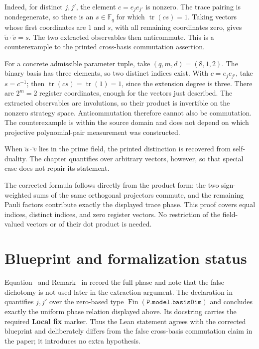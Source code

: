 \documentclass[11pt]{article}
\begin{document}
Indeed, for distinct $j,j'$, the element $c=e_je_{j'}$ is nonzero.  The trace
pairing is nondegenerate, so there is an $s\in\mathbb F_q$ for which
$\operatorname{tr}(cs)=1$.  Taking vectors whose first coordinates are $1$
and $s$, with all remaining coordinates zero, gives
$\widetilde u\mathbin{\cdot}\widetilde v=s$.  The two extracted observables
then anticommute.  This is a counterexample to the printed cross-basis
commutation assertion.

For a concrete admissible parameter tuple, take $(q,m,d)=(8,1,2)$.
The binary basis has three elements, so two distinct indices exist.  With
$c=e_je_{j'}$, take $s=c^{-1}$; then
$\operatorname{tr}(cs)=\operatorname{tr}(1)=1$, since the extension degree is
three.  There are $2^m=2$ register coordinates, enough for the vectors just
described.  The extracted observables are involutions, so their product is
invertible on the nonzero strategy space.  Anticommutation therefore cannot
also be commutation.  The counterexample is within the source domain and does
not depend on which projective polynomial-pair measurement was constructed.

When $\widetilde u\mathbin{\cdot}\widetilde v$ lies in the prime field, the
printed distinction is recovered from self-duality.  The chapter quantifies
over arbitrary vectors, however, so that special case does not repair its
statement.

The corrected formula follows directly from the product form: the two
sign-weighted sums of the same orthogonal projectors commute, and the remaining
Pauli factors contribute exactly the displayed trace phase.  This proof covers
equal indices, distinct indices, and zero register vectors.  No restriction of
the field-valued vectors or of their dot product is needed.

\section{Blueprint and formalization status}

Equation~ and
Remark~ in
 record the full phase and
note that the false dichotomy is not used later in the extraction argument.
The declaration  in
 quantifies
$j,j'$ over the zero-based type
$\operatorname{Fin}(\texttt{P.model.basisDim})$ and concludes exactly the
uniform phase relation displayed above.  Its docstring carries the required
\textbf{Local fix} marker.  Thus the Lean statement agrees with the corrected
blueprint and deliberately differs from the false cross-basis commutation
claim in the paper; it introduces no extra hypothesis.
\end{document}
